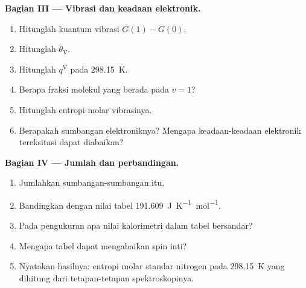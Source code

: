\begin{problem}
\medskip\noindent\textbf{Bagian III --- Vibrasi dan keadaan elektronik.}
\begin{enumerate}[resume, beginpenalty=10000]
  \item Hitunglah kuantum vibrasi $G(1) - G(0)$.
  \item Hitunglah $\theta_{\mathrm V}$.
  \item Hitunglah $q^{\mathrm V}$ pada \qty{298.15}{K}.
  \item Berapa fraksi molekul yang berada pada $v = 1$?
  \item Hitunglah entropi molar vibrasinya.
  \item Berapakah sumbangan elektroniknya? Mengapa keadaan-keadaan elektronik
        tereksitasi dapat diabaikan?
\end{enumerate}

\medskip\noindent\textbf{Bagian IV --- Jumlah dan perbandingan.}
\begin{enumerate}[resume, beginpenalty=10000]
  \item Jumlahkan sumbangan-sumbangan itu.
  \item Bandingkan dengan nilai tabel \qty{191.609}{J.K^{-1}.mol^{-1}}.
  \item Pada pengukuran apa nilai kalorimetri dalam tabel bersandar?
  \item Mengapa tabel dapat mengabaikan spin inti?
  \item Nyatakan hasilnya: entropi molar standar nitrogen pada
        \qty{298.15}{K} yang dihitung dari tetapan-tetapan spektroskopinya.
\end{enumerate}
\end{problem}

